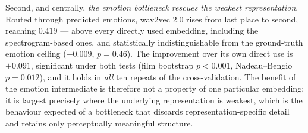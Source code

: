 Second, and centrally, \emph{the emotion bottleneck rescues the weakest representation}.
Routed through predicted emotions, wav2vec 2.0 rises from last place to second, reaching
$0.419$ --- above every directly used embedding, including the spectrogram-based ones, and
statistically indistinguishable from the ground-truth emotion ceiling
($-0.009$, $p = 0.46$). The improvement over its own direct use is $+0.091$, significant
under both tests (film bootstrap $p < 0.001$, Nadeau--Bengio $p = 0.012$), and it holds
in \emph{all} ten repeats of the cross-validation. The benefit of the
emotion intermediate is therefore not a property of one particular embedding: it is
largest precisely where the underlying representation is weakest, which is the behaviour
expected of a bottleneck that discards representation-specific detail and retains only
perceptually meaningful structure.
